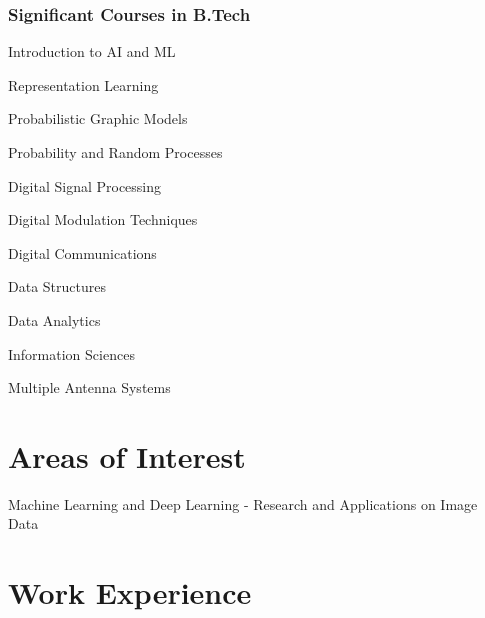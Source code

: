 \documentclass[11pt]{article} %
\begin{document}


\subsubsection{Significant Courses in B.Tech}
\begin{inparaitem}[\hspace{2mm} •]
\item Introduction to AI and ML
\item Representation Learning
\item Probabilistic Graphic Models
\item Probability and Random Processes
\item Digital Signal Processing
\item Digital Modulation Techniques
\item Digital Communications
\item Data Structures 
\item Data Analytics
\item Information Sciences
\item Multiple Antenna Systems
\end{inparaitem}

\hline 

\section{Areas of Interest}
Machine Learning and Deep Learning - Research and Applications on Image Data

\vspace{3mm}
\hline

\section{Work Experience}
\end{document}
